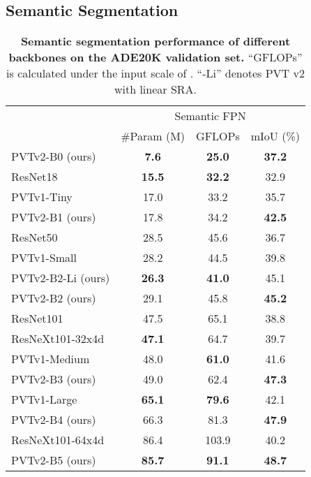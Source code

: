 \documentclass[10pt,twocolumn,letterpaper]{article}
\newlength\savedwidth
\newcommand\whline{\noalign{\global\savedwidth\arrayrulewidth\global\arrayrulewidth 0.8pt}\hline\noalign{\global\arrayrulewidth\savedwidth}}
\begin{document}
	\subsection{Semantic Segmentation}\label{sec:seg}
	
	\begin{table}[t]
		\centering
		\setlength{\tabcolsep}{1.9mm}
		\footnotesize
		\begin{tabular}{l|c|c|c}
\renewcommand{\arraystretch}{0.1}
	\multirow{2}{*}{Backbone} & \multicolumn{3}{c}{Semantic FPN}\\
	\cline{2-4}
	& \#Param (M) & GFLOPs & mIoU (\%)   \\
	\whline
	PVTv2-B0 (ours) & \textbf{7.6} & \textbf{25.0} & \textbf{37.2} \\
	\hline
	ResNet18~\cite{he2016deep} & \textbf{15.5} & \textbf{32.2} & 32.9 \\
PVTv1-Tiny~\cite{pvt} & 17.0 & 33.2 & {35.7} \\
	PVTv2-B1 (ours) & 17.8 & 34.2 & \textbf{42.5} \\
	\hline
ResNet50~\cite{he2016deep} & 28.5&45.6 & 36.7\\
PVTv1-Small~\cite{pvt} & {28.2}& 44.5& {39.8}\\
PVTv2-B2-Li (ours) & \textbf{26.3} & \textbf{41.0} & 45.1 \\
PVTv2-B2 (ours) & 29.1 & 45.8 & \textbf{45.2} \\
\hline
ResNet101~\cite{he2016deep} & 47.5&65.1& 38.8\\
ResNeXt101-32x4d~\cite{xie2017aggregated} & \textbf{47.1} &64.7& 39.7 \\
PVTv1-Medium~\cite{pvt} & 48.0 &\textbf{61.0}& {41.6}\\
PVTv2-B3 (ours) & 49.0 & 62.4 & \textbf{47.3} \\
\hline
PVTv1-Large~\cite{pvt} & \textbf{65.1} &\textbf{79.6}& {42.1} \\
PVTv2-B4 (ours) & 66.3 & 81.3 & \textbf{47.9} \\
\hline
ResNeXt101-64x4d~\cite{xie2017aggregated} & 86.4 &103.9& 40.2\\
PVTv2-B5 (ours) & \textbf{85.7} & \textbf{91.1} & \textbf{48.7} \\
\end{tabular} 		\caption{\textbf{Semantic segmentation performance of different backbones on the ADE20K validation set.}
			``GFLOPs'' is calculated under the input scale of .
			``-Li'' denotes PVT v2 with linear SRA.
		}
		\label{tab:seg}
	\end{table}
	
\end{document}

